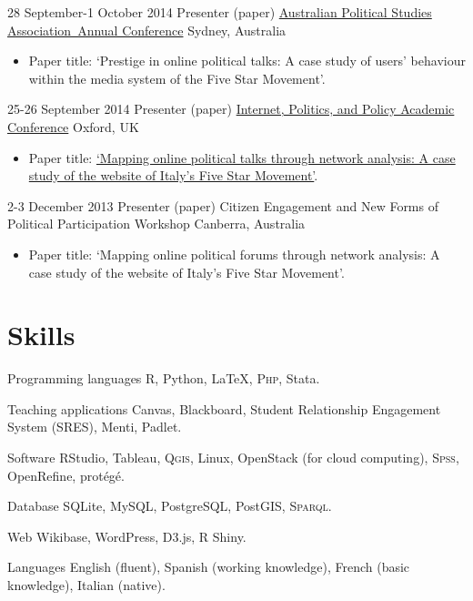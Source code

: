 \documentclass[11pt,a4paper,sans]{moderncv}
\begin{document}
    \cventry
        {28 September-1 October 2014} %
    {Presenter (paper)} %
    {\href{https://sites.google.com/site/apsa2014/home}{Australian Political Studies Association Annual Conference}} %
    {Sydney, Australia} %
{}
    {
      \begin{itemize} %
        \item {Paper title: `Prestige in online political talks: A case study of users' behaviour within the media system of the Five Star Movement'.}
      \end{itemize}
    }

    \cventry
        {25-26 September 2014} %
    {Presenter (paper)} %
    {\href{http://ipp.oii.ox.ac.uk/2014}{Internet, Politics, and Policy Academic Conference}} %
    {Oxford, UK} %
{}
    {
      \begin{itemize} %
        \item {Paper title: \href{http://ipp.oii.ox.ac.uk/2014/programme-2014/track-d-networked-politics/political-and-personal-networks/francesco-bailo-mapping-online-political}{`Mapping online political talks through network analysis: A case study of the website of Italy's Five Star Movement'}.}
      \end{itemize}
    }

    \cventry
     {2-3 December 2013} %
    {Presenter (paper)} %
    {Citizen Engagement and New Forms of Political Participation Workshop} %
    {Canberra, Australia} %
    {}
    {
      \begin{itemize} %
        \item {Paper title: `Mapping online political forums through network analysis: A case study of the website of Italy's Five Star Movement'.}
      \end{itemize}
    }

\section{Skills}

  \cvline
    {Programming languages} %
    {\textsc{R}, Python, LaTeX, \textsc{Php},  Stata.} 

  \cvline
    {Teaching applications} %
    {Canvas, Blackboard, Student Relationship Engagement System (SRES), Menti, Padlet.} 

  \cvline
    {Software} %
    {RStudio, Tableau, \textsc{Qgis}, Linux, OpenStack (for cloud computing), \textsc{Spss}, OpenRefine, protégé.} 

  \cvline
    {Database} %
    {SQLite, MySQL, PostgreSQL, PostGIS, \textsc{Sparql}.} %

  \cvline
    {Web} %
    {Wikibase, WordPress, D3.js, R Shiny.} %

  \cvline
    {Languages} %
    {English (fluent), Spanish (working knowledge), French (basic knowledge), Italian (native).} %
\end{document}
